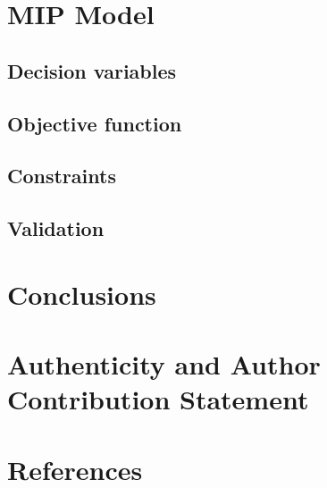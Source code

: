 \documentclass{article}
\begin{document}
\section{MIP Model}

\subsection{Decision variables}

\subsection{Objective function}

\subsection{Constraints}

\subsection{Validation}

\section{Conclusions}

\section{Authenticity and Author Contribution Statement}

\section{References}
\end{document}
